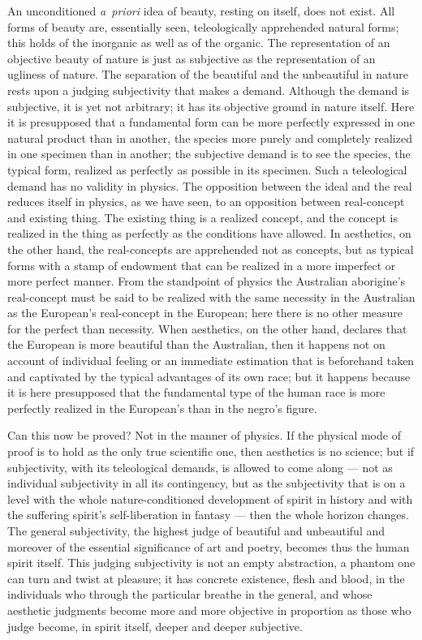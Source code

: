 \documentclass[12pt]{book}
\begin{document}
An unconditioned \textit{a~priori} idea of beauty, resting on itself, does not exist. All forms
of beauty are, essentially seen, teleologically apprehended natural forms; this holds of the
inorganic as well as of the organic. The representation of an objective beauty of nature is just
as subjective as the representation of an ugliness of nature. The separation of the beautiful and
the unbeautiful in nature rests upon a judging subjectivity that makes a demand. Although the
demand is subjective, it is yet not arbitrary; it has its objective ground in nature itself. Here
it is presupposed that a fundamental form can be more perfectly expressed in one natural product
than in another, the species more purely and completely realized in one specimen than in another;
the subjective demand is to see the species, the typical form, realized as perfectly as possible
in its specimen. Such a teleological demand has no validity in physics. The opposition between the
ideal and the real reduces itself in physics, as we have seen, to an opposition between
real-concept and existing thing. The existing thing is a realized concept, and the concept is
realized in the thing as perfectly as the conditions have allowed. In aesthetics, on the other
hand, the real-concepts are apprehended not as concepts, but as typical forms with a stamp of
endowment that can be realized in a more imperfect or more perfect manner. From the standpoint of
physics the Australian aborigine's real-concept must be said to be realized with the same
necessity in the Australian as the European's real-concept in the European; here there is no
other measure for the perfect than necessity. When aesthetics, on the other hand, declares that
the European is more beautiful than the Australian, then it happens not on account of individual
feeling or an immediate estimation that is beforehand taken and captivated by the typical
advantages of its own race; but it happens because it is here presupposed that the fundamental
type of the human race is more perfectly realized in the European's than in the negro's figure.

Can this now be proved? Not in the manner of physics. If the physical mode of proof is to hold as
the only true scientific one, then aesthetics is no science; but if subjectivity, with its
teleological demands, is allowed to come along --- not as individual subjectivity in all its
contingency, but as the subjectivity that is on a level with the whole nature-conditioned
development of spirit in history and with the suffering spirit's self-liberation in fantasy ---
then the whole horizon changes. The general subjectivity, the highest judge of beautiful and
unbeautiful and moreover of the essential significance of art and poetry, becomes thus the human
spirit itself. This judging subjectivity is not an empty abstraction, a phantom one can turn and
twist at pleasure; it has concrete existence, flesh and blood, in the individuals who through the
particular breathe in the general, and whose aesthetic judgments become more and more objective
in proportion as those who judge become, in spirit itself, deeper and deeper subjective.
\end{document}
